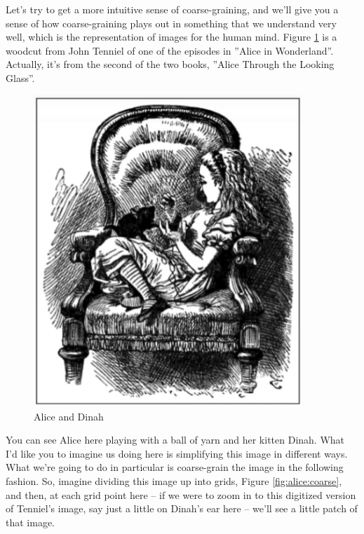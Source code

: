 \documentclass[]{article}
\begin{document}
Let's try to get a more intuitive sense of coarse-graining,
and we'll give you a sense of how coarse-graining plays out
in something that we understand very well, which is the representation
of images for the human mind. Figure \ref{fig:alice1} is a woodcut from John Tenniel of one of the episodes in ''Alice in Wonderland''.
Actually, it's from the second of the two books, ''Alice Through the Looking Glass''.

\begin{figure}[H]
	\caption{Alice and Dinah}\label{fig:alice1}
	\includegraphics[width=0.9\textwidth]{Alice1}
\end{figure}
You can see Alice here playing with a ball of yarn and her kitten Dinah.
What I'd like you to imagine us doing here
is simplifying this image in different ways.
What we're going to do in particular is coarse-grain the image
in the following fashion. So, imagine dividing
this image up into grids, Figure \ref{fig:alice:coarse}, and then, at each grid point here –
if we were to zoom in to this digitized
version of Tenniel's image,
say just a little on Dinah's ear here –
we'll see a little patch of that image.
\end{document}
